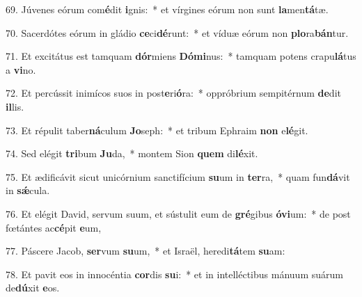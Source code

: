69. Júvenes eórum com\textbf{é}dit \textbf{i}gnis:~*  et vírgines eórum non sunt \textbf{la}men\textbf{tá}tæ.\

70. Sacerdótes eórum in gládio \textbf{ce}ci\textbf{dé}runt:~*  et víduæ eórum non \textbf{plo}ra\textbf{bán}tur.\

71. Et excitátus est tamquam \textbf{dór}miens \textbf{Dó}\textbf{mi}nus:~*  tamquam potens crapu\textbf{lá}tus a \textbf{vi}no.\

72. Et percússit inimícos suos in post\textbf{e}ri\textbf{ó}ra:~*  oppróbrium sempitérnum \textbf{de}dit \textbf{il}lis.\

73. Et répulit taber\textbf{ná}culum \textbf{Jo}seph:~*  et tribum Ephraim \textbf{non} e\textbf{lé}git.\

74. Sed elégit \textbf{tri}bum \textbf{Ju}da,~*  montem Sion \textbf{quem} di\textbf{lé}xit.\

75. Et ædificávit sicut unicórnium sanctifícium \textbf{su}um in \textbf{ter}ra,~*  quam fun\textbf{dá}vit in \textbf{sǽ}cula.\

76. Et elégit David, servum suum, et sústulit eum de \textbf{gré}gibus \textbf{ó}\textbf{vi}um:~*  de post fœtántes ac\textbf{cé}pit \textbf{e}um,\

77. Páscere Jacob, \textbf{ser}vum \textbf{su}um,~*  et Israël, heredi\textbf{tá}tem \textbf{su}am:\

78. Et pavit eos in innocéntia \textbf{cor}dis \textbf{su}i:~*  et in intelléctibus mánuum suárum de\textbf{dú}xit \textbf{e}os.\

